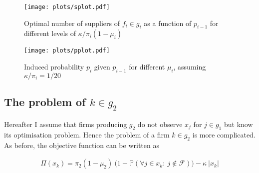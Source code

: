 \documentclass[american, abstract=on]{scrartcl}
\newcommand{\F}{\mathcal{F}}
\renewcommand{\P}{\mathbb{P}}
\newcommand{\abs}[1]{\left\lvert#1\right\rvert}
\begin{document}
\begin{figure}[H]
  \centering
  \texttt{[image: plots/splot.pdf]} 
  \caption{Optimal number of suppliers of $f_i \in g_i$ as a function of $p_{i - 1}$ for different levels of $\kappa \Big/ \pi_i (1 - \mu_i)$}
  \label{fig:splot}
\end{figure}

\begin{figure}[H]
  \centering
  \texttt{[image: plots/pplot.pdf]} 
  \caption{Induced probability $p_i$ given $p_{i - 1}$ for different $\mu_i$, assuming $\kappa / \pi_i = 1/20$}
  \label{fig:pplot}
\end{figure}

\subsection[The problem of good two]{The problem of $k \in g_2$}

Hereafter I assume that firms producing $g_2$ do not observe $x_j$ for $j \in g_1$ but know its optimisation problem. Hence the problem of a firm $k \in g_2$ is more complicated. As before, the objective function can be written as 

\begin{equation}
  \begin{split}
    \Pi(x_k) = \pi_2 (1 - \mu_2) \  \Big(1 - \P\left(\forall j \in x_k: \ j \notin \F \right) \Big) - \kappa \ \abs{x_k}
  \end{split}
\end{equation}

\newpage
\nocite{*}
\printbibliography
\end{document}
